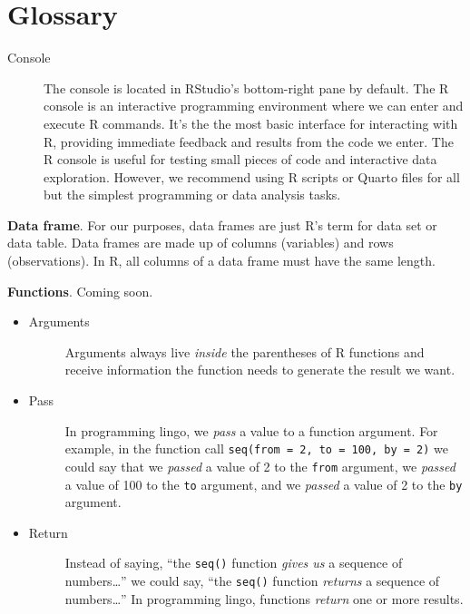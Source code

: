 \documentclass[
  letterpaper,
  DIV=11,
  numbers=noendperiod]{scrreprt}
\begin{document}
\cleardoublepage
{}
{}
\appendix

\chapter{Glossary}\label{sec-glossary}

\begin{description}
\item[\label{glossary-console}{Console}]
The console is located in RStudio's bottom-right pane by default. The R
console is an interactive programming environment where we can enter and
execute R commands. It's the the most basic interface for interacting
with R, providing immediate feedback and results from the code we enter.
The R console is useful for testing small pieces of code and interactive
data exploration. However, we recommend using R scripts or Quarto files
for all but the simplest programming or data analysis tasks.
\end{description}

\textbf{Data frame}. For our purposes, data frames are just R's term for
data set or data table. Data frames are made up of columns (variables)
and rows (observations). In R, all columns of a data frame must have the
same length.

\textbf{Functions}. Coming soon.

\begin{itemize}
\item
  \begin{description}
  \item[\label{glossary-arguments}{Arguments}]
  Arguments always live \emph{inside} the parentheses of R functions and
  receive information the function needs to generate the result we want.
  \end{description}
\item
  \begin{description}
  \item[\label{glossary-pass}{Pass}]
  In programming lingo, we \emph{pass} a value to a function argument.
  For example, in the function call
  \texttt{seq(from\ =\ 2,\ to\ =\ 100,\ by\ =\ 2)} we could say that we
  \emph{passed} a value of 2 to the \texttt{from} argument, we
  \emph{passed} a value of 100 to the \texttt{to} argument, and we
  \emph{passed} a value of 2 to the \texttt{by} argument.
  \end{description}
\item
  \begin{description}
  \item[\label{glossary-return}{Return}]
  Instead of saying, ``the \texttt{seq()} function \emph{gives us} a
  sequence of numbers\ldots{}'' we could say, ``the \texttt{seq()}
  function \emph{returns} a sequence of numbers\ldots{}'' In programming
  lingo, functions \emph{return} one or more results.
  \end{description}
\end{itemize}
\end{document}
